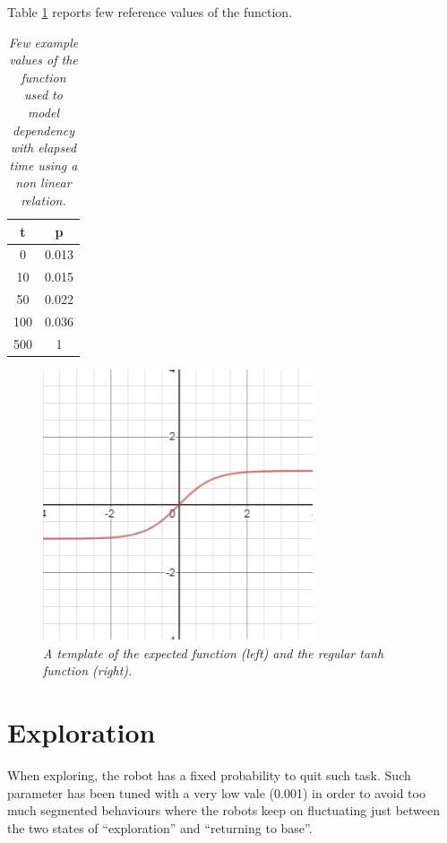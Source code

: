 \noindent
Table \ref{tab:f-values} reports few reference values of the function.

\begin{table}[H]
\centering
\begin{tabular}{| c | c |}

\hline
t & p \\
\hline
 0  & 0.013 \\
 10 & 0.015 \\
 50 & 0.022 \\
100 & 0.036 \\
500 & 1 \\
\hline

\end{tabular}
\caption{\label{tab:f-values}\textit{Few example values of the function used to model dependency with elapsed time using a non linear relation.}}
\end{table}

\begin{figure}[H]
\centering
\includegraphics[width=8cm, keepaspectratio]{images/tanh.png}
\caption{\textit{A template of the expected function (left) and the regular tanh function (right).}}
\label{fig:tanh}
\end{figure}

\section{Exploration}

When exploring, the robot has a fixed probability to quit such task. Such parameter has been tuned with a very low vale (0.001) in order to avoid too much segmented behaviours where the robots keep on fluctuating just between the two states of ``exploration'' and ``returning to base''.  

